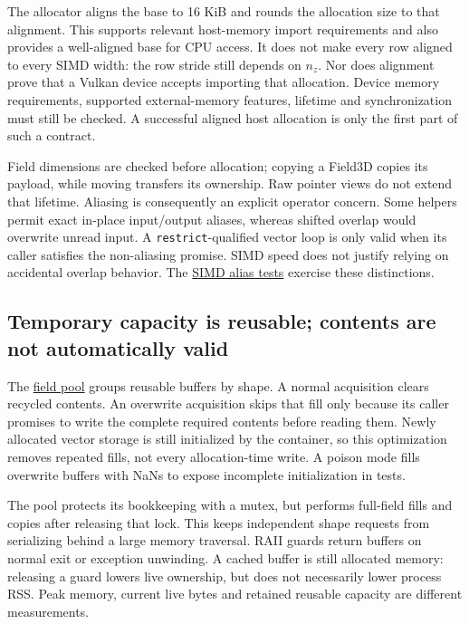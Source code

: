 The allocator aligns the base to 16 KiB and rounds the allocation size to that
alignment. This supports relevant host-memory import requirements and also
provides a well-aligned base for CPU access. It does not make every row aligned
to every SIMD width: the row stride still depends on $n_z$. Nor does alignment
prove that a Vulkan device accepts importing that allocation. Device memory
requirements, supported external-memory features, lifetime and synchronization
must still be checked. A successful aligned host allocation is only the first
part of such a contract.

Field dimensions are checked before allocation; copying a Field3D copies its
payload, while moving transfers its ownership. Raw pointer views do not extend
that lifetime. Aliasing is consequently an explicit operator concern. Some
helpers permit exact in-place input/output aliases, whereas shifted overlap
would overwrite unread input. A \texttt{restrict}-qualified vector loop is
only valid when its caller satisfies the non-aliasing promise. SIMD speed does
not justify relying on accidental overlap behavior. The
\href{../tests/core/test_simd_aliasing.cpp}{SIMD alias tests} exercise these
distinctions.

\subsection{Temporary capacity is reusable; contents are not automatically valid}

The \href{../include/core/field/field_pool.hpp}{field pool} groups reusable
buffers by shape. A normal acquisition clears recycled contents. An
overwrite acquisition skips that fill only because its caller promises to
write the complete required contents before reading them. Newly allocated
vector storage is still initialized by the container, so this optimization
removes repeated fills, not every allocation-time write. A poison mode fills
overwrite buffers with NaNs to expose incomplete initialization in tests.

The pool protects its bookkeeping with a mutex, but performs full-field fills
and copies after releasing that lock. This keeps independent shape requests
from serializing behind a large memory traversal. RAII guards return buffers
on normal exit or exception unwinding. A cached buffer is still allocated
memory: releasing a guard lowers live ownership, but does not necessarily
lower process RSS. Peak memory, current live bytes and retained reusable
capacity are different measurements.

